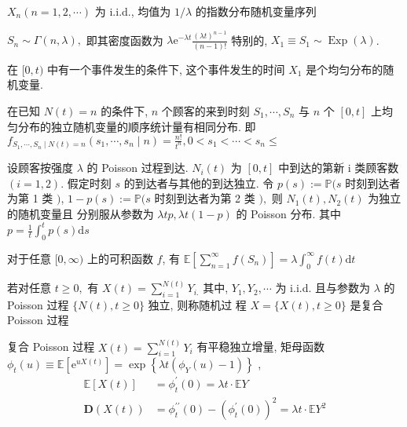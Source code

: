 \documentclass[10pt]{yerbaformat}
\begin{document}
\begin{lemma}[来到时间间隔分布]
    $X_{n}(n=1,2, \cdots)$ 为 i.i.d., 均值为 $1 / \lambda$ 的指数分布随机变量序列
\end{lemma}

\begin{lemma}[等待时间分布]
    $S_{n} \sim \Gamma(n, \lambda),$ 即其密度函数为 $\lambda \mathrm{e}^{-\lambda t} \frac{(\lambda t)^{n-1}}{(n-1) !}$ 特别的, $X_{1} \equiv S_{1} \sim \operatorname{Exp}(\lambda)$.
\end{lemma}

\begin{lemma}
    在 $[0, t)$ 中有一个事件发生的条件下, 这个事件发生的时间 $X_{1}$ 是个均匀分布的随机变量.
\end{lemma}

\begin{theorem}
    在已知 $N(t)=n$ 的条件下, $n$ 个顾客的来到时刻 $S_{1}, \cdots, S_{n}$ 与 $n$ 个 $[0, t]$ 上均匀分布的独立随机变量的顺序统计量有相同分布. 即 $f_{S_{1}, \cdots, S_{n} \mid N(t)=n}\left(s_{1}, \cdots, s_{n} \mid n\right)=\frac{n !}{t^{n}}, 0<s_{1}<\cdots<s_{n} \leq $
\end{theorem}

\begin{theorem}
    设顾客按强度 $\lambda$ 的 Poisson 过程到达. $N_{i}(t)$ 为 $[0, t]$ 中到达的第新 $\mathrm{i}$ 类顾客数 $(i=1,2) .$ 假定时刻 $s$ 的到达者与其他的到达独立. 令
    $p(s):=\mathbb{P}(s$ 时刻到达者为第 1 类 $)$, $1-p(s):=\mathbb{P}(s$ 时刻到达者为第 2 类 $),$ 则 $N_{1}(t), N_{2}(t)$ 为独立的随机变量且 分别服从参数为 $\lambda t p, \lambda t(1-p)$ 的 Poisson 分布. 其中 $p=\frac{1}{t} \int_{0}^{t} p(s) \mathrm{d} s$
\end{theorem}

\begin{lemma}
    对于任意 $[0, \infty)$ 上的可积函数 $f$, 有 $\mathbb{E}\left[\sum_{n=1}^{\infty} f\left(S_{n}\right)\right]=\lambda \int_{0}^{\infty} f(t) \mathrm{d} t$
\end{lemma}

\begin{definition}[复合 Poisson 过程]
    若对任意 $t \geq 0,$ 有 $X(t)=\sum_{i=1}^{N(t)} Y_{i .}$ 其中, $Y_{1}, Y_{2}, \cdots$ 为 i.i.d. 且与参数为 $\lambda$ 的 Poisson 过程 $\{N(t), t \geq 0\}$ 独立, 则称随机过 程 $X=\{X(t), t \geq 0\}$ 是复合 Poisson 过程
\end{definition}

\begin{theorem}
    复合 Poisson 过程 $X(t)=\sum_{i=1}^{N(t)} Y_{i}$ 有平稳独立增量, 矩母函数 $\phi_{t}(u) \equiv \mathbb{E}\left[\mathrm{e}^{u X(t)}\right]=\exp \left\{\lambda t\left(\phi_{Y}(u)-1\right)\right\}$ , $$\begin{aligned} \mathbb{E}[X(t)] &=\phi_{t}^{\prime}(0)=\lambda t \cdot \mathbb{E} Y \\ \mathbf{D}(X(t)) &=\phi_{t}^{\prime \prime}(0)-\left(\phi_{t}^{\prime}(0)\right)^{2}=\lambda t \cdot \mathbb{E} Y^{2} \end{aligned}$$
\end{theorem}
\end{document}

